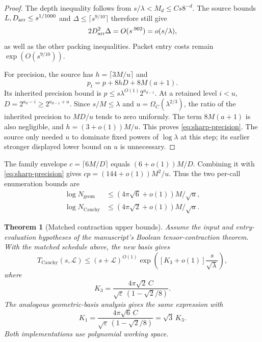\documentclass[11pt]{article}
\newtheorem{theorem}{Theorem}[section]
\theoremstyle{remark}
\begin{document}
\begin{proof}
The depth inequality follows from $s/\lambda<M_d\le Cs8^{-d}$. The source bounds $L,D_{\rm arr}\le s^{1/1000}$ and $\Delta\le\lceil s^{9/10}\rceil$ therefore still give
\[
 2D_{\rm arr}^2\Delta=O(s^{.902})=o(s/\lambda),
\]
as well as the other packing inequalities. Packet entry costs remain $\exp(O(s^{9/10}))$.

For precision, the source has $h=\lceil3M/u\rceil$ and
\[
 p_t=p+8hD+8M(a+1).
\]
Its inherited precision bound is $p\le s\lambda^{O(1)}2^{a_{d-1}}$. At a retained level $i<u$, $D=2^{a_d-i}\ge2^{a_{d-1}+u}$. Since $s/M\le\lambda$ and $u=\Omega_C(\lambda^{2/3})$, the ratio of the inherited precision to $MD/u$ tends to zero uniformly. The term $8M(a+1)$ is also negligible, and $h=(3+o(1))M/u$. This proves \eqref{eq:sharp-precision}. The source only needed $u$ to dominate fixed powers of $\log\lambda$ at this step; its earlier stronger displayed lower bound on $u$ is unnecessary.
\end{proof}

The family envelope $c=\lceil6M/D\rceil$ equals $(6+o(1))M/D$. Combining it with \eqref{eq:sharp-precision} gives $cp=(144+o(1))M^2/u$. Thus the two per-call enumeration bounds are
\begin{align}
 \log N_{\mathrm{geom}}&\le(4\pi\sqrt6+o(1))M/\sqrt u,\label{eq:localold}\\
 \log N_{\mathrm{Cauchy}}&\le(4\pi\sqrt2+o(1))M/\sqrt u.\label{eq:localnew}
\end{align}

\begin{theorem}[Matched contraction upper bounds]\label{thm:global}
Assume the input and entry-evaluation hypotheses of the manuscript's Boolean tensor-contraction theorem. With the matched schedule above, the new basis gives
\begin{equation}\label{eq:global-new}
 T_{\mathrm{Cauchy}}(s,\mathcal L)
 \le(s+\mathcal L)^{O(1)}
 \exp\left(\left[K_3+o(1)\right]\frac{s}{\sqrt\lambda}\right),
\end{equation}
where
\[
 K_3=\frac{4\pi\sqrt2\,C}{\sqrt\varepsilon\,(1-\sqrt2/8)}.
\]
The analogous geometric-basis analysis gives the same expression with
\[
 K_1=\frac{4\pi\sqrt6\,C}{\sqrt\varepsilon\,(1-\sqrt2/8)}
       =\sqrt3\,K_3.
\]
Both implementations use polynomial working space.
\end{theorem}
\end{document}
